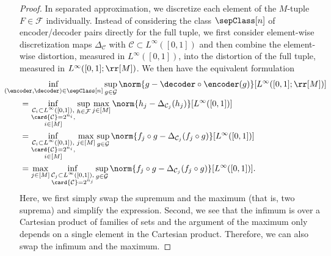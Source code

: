 \documentclass[twoside,11pt]{article}
\newcommand{\set}[1]{\ensuremath{\mathcal{#1}}}
\begin{document}
\begin{proof}
In separated approximation, we discretize each element of the $M$-tuple $F\in\set{F}$ individually.
Instead of considering the class $\sepClass[n]$ of encoder/decoder pairs directly for the full tuple, we first consider element-wise discretization maps $\Delta_{\set{C}}$ with $\set{C}\subset L^\infty([0,1])$ and then combine the element-wise distortion, measured in $L^\infty([0,1])$, into the distortion of the full tuple, measured in $L^\infty([0,1];\rr[M])$.
We then have the equivalent formulation
\begin{align}
    &\kern-2em\inf_{(\encoder,\decoder)\in\sepClass[n]}
    \sup_{g\in\set{G}}
    \norm{g-\decoder\circ\encoder(g)}[{L^\infty([0,1];\rr[M])}]
    \\&
    =
    \inf_{\substack{\set{C}_i\subset L^\infty([0,1]),\\\card{\set{C}}=2^{n_i},\\i\in[M]}}
    \sup_{h\in\set{F}}
    \max_{j\in[M]}
    \norm{h_j-\Delta_{\set{C}_j}(h_j)}[{L^\infty([0,1])}]
    \\&
    =
    \inf_{\substack{\set{C}_i\subset L^\infty([0,1]),\\\card{\set{C}}=2^{n_i},\\i\in[M]}}
    \max_{j\in[M]}
    \sup_{g\in\set{G}}
    \norm{f_j\circ g-\Delta_{\set{C}_j}(f_j\circ g)}[{L^\infty([0,1])}]
    \\&
    =
    \max_{j\in[M]}
    \inf_{\substack{\set{C}_j\subset L^\infty([0,1]),\\\card{\set{C}}=2^{n_j}}}
    \sup_{g\in\set{G}}
    \norm{f_j\circ g-\Delta_{\set{C}_j}(f_j\circ g)}[{L^\infty([0,1])}].
\end{align}
Here, we first simply swap the supremum and the maximum (that is, two suprema) and simplify the expression.
Second, we see that the infimum is over a Cartesian product of families of sets and the argument of the maximum only depends on a single element in the Cartesian product.
Therefore, we can also swap the infimum and the maximum.


\end{proof}
\end{document}
